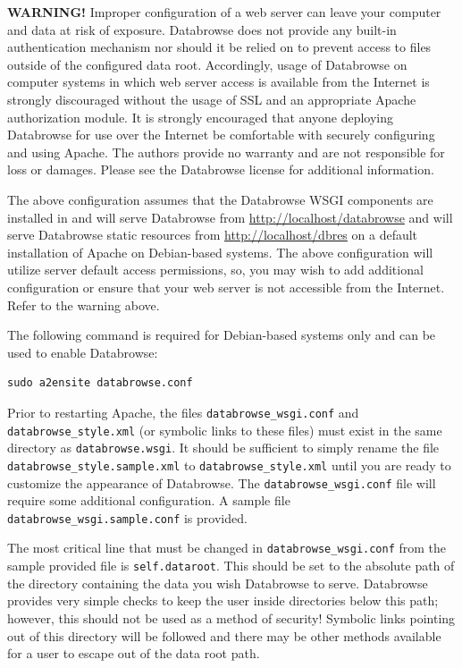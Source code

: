 \documentclass[10pt]{article}
\begin{document}
\textbf{WARNING!}  Improper configuration of a web server can leave your computer and data at risk of exposure.  Databrowse does not provide any built-in authentication mechanism nor should it be relied on to prevent access to files outside of the configured data root.  Accordingly, usage of Databrowse on computer systems in which web server access is available from the Internet is strongly discouraged without the usage of SSL and an appropriate Apache authorization module.  It is strongly encouraged that anyone deploying Databrowse for use over the Internet be comfortable with securely configuring and using Apache.  The authors provide no warranty and are not responsible for loss or damages.  Please see the Databrowse license for additional information.

The above configuration assumes that the Databrowse WSGI components are installed in  and will serve Databrowse from \url{http://localhost/databrowse} and will serve Databrowse static resources from \url{http://localhost/dbres} on a default installation of Apache on Debian-based systems.  The above configuration will utilize server default access permissions, so, you may wish to add additional configuration or ensure that your web server is not accessible from the Internet.  Refer to the warning above.

The following command is required for Debian-based systems only and can be used to enable Databrowse:

\begin{verbatim}
sudo a2ensite databrowse.conf
\end{verbatim}

Prior to restarting Apache, the files \texttt{databrowse\_wsgi.conf} and \texttt{databrowse\_style.xml} (or symbolic links to these files) must exist in the same directory as \texttt{databrowse.wsgi}.  It should be sufficient to simply rename the file \texttt{databrowse\_style.sample.xml} to \texttt{databrowse\_style.xml} until you are ready to customize the appearance of Databrowse.  The \texttt{databrowse\_wsgi.conf} file will require some additional configuration.  A sample file \texttt{databrowse\_wsgi.sample.conf} is provided.

The most critical line that must be changed in \texttt{databrowse\_wsgi.conf} from the sample provided file is \texttt{self.dataroot}.  This should be set to the absolute path of the directory containing the data you wish Databrowse to serve.  Databrowse provides very simple checks to keep the user inside directories below this path; however, this should not be used as a method of security!  Symbolic links pointing out of this directory will be followed and there may be other methods available for a user to escape out of the data root path.
\end{document}
